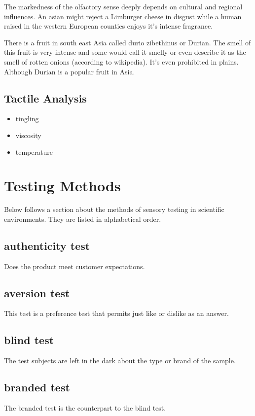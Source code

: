 \documentclass[]{scrartcl}
\begin{document}
The markedness of the olfactory sense deeply depends on cultural and regional influences.
An asian might reject a Limburger cheese in disgust while a human raised in the western European
counties enjoys it's intense fragrance.

There is a fruit in south east Asia called durio zibethinus or Durian.
The smell of this fruit is very intense and some would call it smelly or even describe
it as the smell of rotten onions (according to wikipedia). It's even prohibited
in plains. Although Durian is a popular fruit in Asia.

\subsection{Tactile Analysis}
\begin{itemize}
  \item tingling
  \item viscosity
  \item temperature
\end{itemize}


\section{Testing Methods}
Below follows a section about the methods of sensory testing in scientific environments.
They are listed in alphabetical order.
\subsection{authenticity test}
Does the product meet customer expectations.

\subsection{aversion test}
This test is a preference test that permits just like or dislike as an answer.

\subsection{blind test}
The test subjects are left in the dark about the type or brand of the sample.

\subsection{branded test}
The branded test is the counterpart to the blind test.
\end{document}
